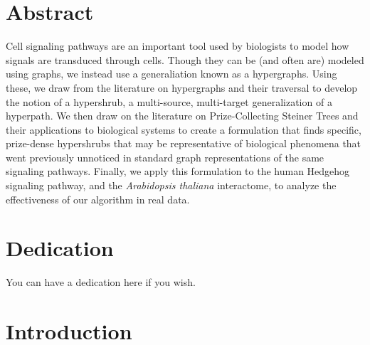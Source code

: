 \documentclass[12pt,twoside]{reedthesis}
\theoremstyle{definition}
\begin{document}
\vfill\vfill


    \tableofcontents
    \listoftables
    \listoffigures

    \chapter*{Abstract}
	Cell signaling pathways are an important tool used by biologists to model how signals are transduced through cells. Though they can be (and often are) modeled using graphs, we instead use a generaliation known as a hypergraphs. Using these, we draw from the literature on hypergraphs and their traversal to develop the notion of a hypershrub, a multi-source, multi-target generalization of a hyperpath. We then draw on the literature on Prize-Collecting Steiner Trees and their applications to biological systems to create a formulation that finds specific, prize-dense hypershrubs that may be representative of biological phenomena that went previously unnoticed in standard graph representations of the same signaling pathways. Finally, we apply this formulation to the human Hedgehog signaling pathway, and the \textit{Arabidopsis thaliana} interactome, to analyze the effectiveness of our algorithm in real data.

	\chapter*{Dedication}
	You can have a dedication here if you wish.

  \mainmatter %
  \pagestyle{fancyplain} %


    \chapter*{Introduction}
\end{document}
